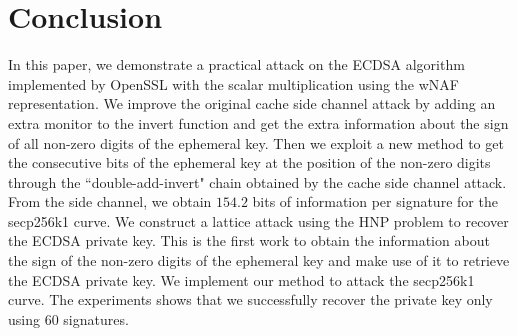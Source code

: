 \section{Conclusion}
\label{sec:conclusion}
In this paper, we demonstrate a practical attack on the ECDSA algorithm implemented by OpenSSL with the scalar multiplication using the wNAF representation.
We improve the original cache side channel attack by adding an extra monitor to the invert function and get the extra information about the sign of all non-zero digits of the ephemeral key.
Then we exploit a new method to get the consecutive bits of the ephemeral key at the position of the non-zero digits through the ``double-add-invert" chain obtained by the cache side channel attack.
From the side channel, we obtain $154.2$ bits of information per signature for the secp256k1 curve.
We construct a lattice attack using the HNP problem to recover the ECDSA private key.
This is the first work to obtain the information about the sign of the non-zero digits of the ephemeral key and make use of it to retrieve the ECDSA private key.
We implement our method to attack the secp256k1 curve.
The experiments shows that we successfully recover the private key only using $60$ signatures.






